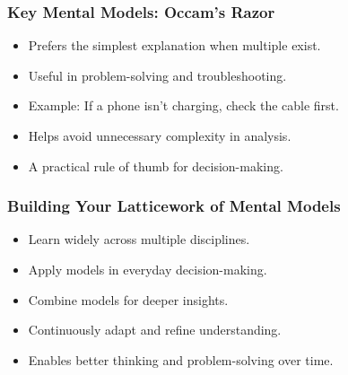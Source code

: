 \begin{frame}[fragile]\frametitle{Key Mental Models: Occam’s Razor}
    \begin{itemize}
        \item Prefers the simplest explanation when multiple exist.
        \item Useful in problem-solving and troubleshooting.
        \item Example: If a phone isn’t charging, check the cable first.
        \item Helps avoid unnecessary complexity in analysis.
        \item A practical rule of thumb for decision-making.
    \end{itemize}
\end{frame}

\begin{frame}[fragile]\frametitle{Building Your Latticework of Mental Models}
    \begin{itemize}
        \item Learn widely across multiple disciplines.
        \item Apply models in everyday decision-making.
        \item Combine models for deeper insights.
        \item Continuously adapt and refine understanding.
        \item Enables better thinking and problem-solving over time.
    \end{itemize}
\end{frame}




